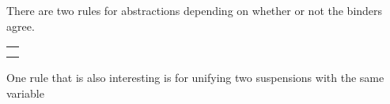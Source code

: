 \begin{isabellebody}
\begin{isamarkuptext}
  \noindent
  There are two rules for abstractions depending on whether or not the binders agree.

  \begin{center}
  \begin{tabular}{l}
  \isa{{\isaliteral{7B}{\isacharbraceleft}}a{\isaliteral{2E}{\isachardot}}t\ {\isaliteral{5C3C617070726F783E}{\isasymapprox}}\isaliteral{5C3C5E7375703E}{}\isactrlsup {\isaliteral{3F}{\isacharquery}}\ a{\isaliteral{2E}{\isachardot}}s{\isaliteral{2C}{\isacharcomma}}\ {\isaliteral{5C3C646F74733E}{\isasymdots}}{\isaliteral{7D}{\isacharbraceright}}\ {\isaliteral{5C3C4C6F6E6772696768746172726F773E}{\isasymLongrightarrow}}\ {\isaliteral{7B}{\isacharbraceleft}}t\ {\isaliteral{5C3C617070726F783E}{\isasymapprox}}\isaliteral{5C3C5E7375703E}{}\isactrlsup {\isaliteral{3F}{\isacharquery}}\ s{\isaliteral{2C}{\isacharcomma}}\ {\isaliteral{5C3C646F74733E}{\isasymdots}}{\isaliteral{7D}{\isacharbraceright}}}\\
  \isa{{\isaliteral{7B}{\isacharbraceleft}}a{\isaliteral{2E}{\isachardot}}t\ {\isaliteral{5C3C617070726F783E}{\isasymapprox}}\isaliteral{5C3C5E7375703E}{}\isactrlsup {\isaliteral{3F}{\isacharquery}}\ b{\isaliteral{2E}{\isachardot}}s{\isaliteral{2C}{\isacharcomma}}\ {\isaliteral{5C3C646F74733E}{\isasymdots}}{\isaliteral{7D}{\isacharbraceright}}\ {\isaliteral{5C3C4C6F6E6772696768746172726F773E}{\isasymLongrightarrow}}\ {\isaliteral{7B}{\isacharbraceleft}}t\ {\isaliteral{5C3C617070726F783E}{\isasymapprox}}\isaliteral{5C3C5E7375703E}{}\isactrlsup {\isaliteral{3F}{\isacharquery}}\ {\isaliteral{28}{\isacharparenleft}}a\ b{\isaliteral{29}{\isacharparenright}}\ {\isaliteral{5C3C62756C6C65743E}{\isasymbullet}}\ s{\isaliteral{2C}{\isacharcomma}}\ a\ {\isaliteral{23}{\isacharhash}}\isaliteral{5C3C5E7375703E}{}\isactrlsup {\isaliteral{3F}{\isacharquery}}\ s{\isaliteral{2C}{\isacharcomma}}\ {\isaliteral{5C3C646F74733E}{\isasymdots}}{\isaliteral{7D}{\isacharbraceright}}}
  \end{tabular}
  \end{center}

  \noindent
  One rule that is also interesting is for unifying two suspensions with
  the same variable


\end{isamarkuptext}
\end{isabellebody}
